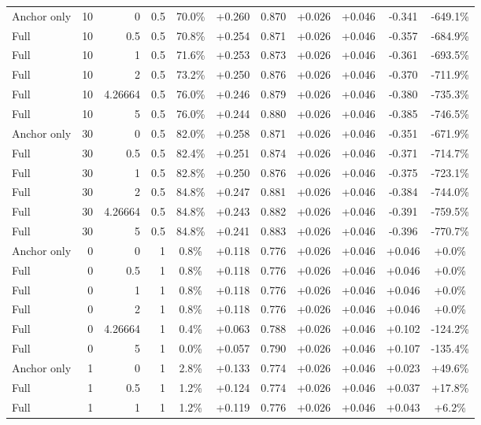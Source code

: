 \begin{table}[htbp]
\begin{tabular}{lrrrccccccc}
Anchor only & 10 & 0 & 0.5 & 70.0\% & +0.260 & 0.870 & +0.026 & +0.046 & -0.341 & -649.1\% \\
Full & 10 & 0.5 & 0.5 & 70.8\% & +0.254 & 0.871 & +0.026 & +0.046 & -0.357 & -684.9\% \\
Full & 10 & 1 & 0.5 & 71.6\% & +0.253 & 0.873 & +0.026 & +0.046 & -0.361 & -693.5\% \\
Full & 10 & 2 & 0.5 & 73.2\% & +0.250 & 0.876 & +0.026 & +0.046 & -0.370 & -711.9\% \\
Full & 10 & 4.26664 & 0.5 & 76.0\% & +0.246 & 0.879 & +0.026 & +0.046 & -0.380 & -735.3\% \\
Full & 10 & 5 & 0.5 & 76.0\% & +0.244 & 0.880 & +0.026 & +0.046 & -0.385 & -746.5\% \\
Anchor only & 30 & 0 & 0.5 & 82.0\% & +0.258 & 0.871 & +0.026 & +0.046 & -0.351 & -671.9\% \\
Full & 30 & 0.5 & 0.5 & 82.4\% & +0.251 & 0.874 & +0.026 & +0.046 & -0.371 & -714.7\% \\
Full & 30 & 1 & 0.5 & 82.8\% & +0.250 & 0.876 & +0.026 & +0.046 & -0.375 & -723.1\% \\
Full & 30 & 2 & 0.5 & 84.8\% & +0.247 & 0.881 & +0.026 & +0.046 & -0.384 & -744.0\% \\
Full & 30 & 4.26664 & 0.5 & 84.8\% & +0.243 & 0.882 & +0.026 & +0.046 & -0.391 & -759.5\% \\
Full & 30 & 5 & 0.5 & 84.8\% & +0.241 & 0.883 & +0.026 & +0.046 & -0.396 & -770.7\% \\
Anchor only & 0 & 0 & 1 & 0.8\% & +0.118 & 0.776 & +0.026 & +0.046 & +0.046 & +0.0\% \\
Full & 0 & 0.5 & 1 & 0.8\% & +0.118 & 0.776 & +0.026 & +0.046 & +0.046 & +0.0\% \\
Full & 0 & 1 & 1 & 0.8\% & +0.118 & 0.776 & +0.026 & +0.046 & +0.046 & +0.0\% \\
Full & 0 & 2 & 1 & 0.8\% & +0.118 & 0.776 & +0.026 & +0.046 & +0.046 & +0.0\% \\
Full & 0 & 4.26664 & 1 & 0.4\% & +0.063 & 0.788 & +0.026 & +0.046 & +0.102 & -124.2\% \\
Full & 0 & 5 & 1 & 0.0\% & +0.057 & 0.790 & +0.026 & +0.046 & +0.107 & -135.4\% \\
Anchor only & 1 & 0 & 1 & 2.8\% & +0.133 & 0.774 & +0.026 & +0.046 & +0.023 & +49.6\% \\
Full & 1 & 0.5 & 1 & 1.2\% & +0.124 & 0.774 & +0.026 & +0.046 & +0.037 & +17.8\% \\
Full & 1 & 1 & 1 & 1.2\% & +0.119 & 0.776 & +0.026 & +0.046 & +0.043 & +6.2\% \\

\end{tabular}
\end{table}
